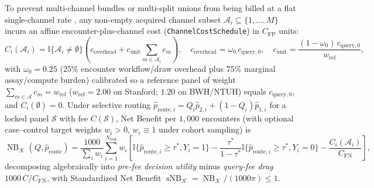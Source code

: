 \documentclass[11pt]{article}
\theoremstyle{remark}
\begin{document}
To prevent multi-channel bundles or multi-split unions from being billed at a flat single-channel rate \citep{turney1995cost,satz2026collision}, any non-empty acquired channel subset $\mathcal{A}_i \subseteq \{1,\dots,M\}$ incurs an affine encounter-plus-channel cost (\texttt{ChannelCostSchedule}) in $C_{\text{FP}}$ units:
\begin{equation}
  C_i(\mathcal{A}_i) = \mathbb{I}\{\mathcal{A}_i \ne \emptyset\}\!\left(c_{\text{overhead}} + c_{\text{unit}} \sum_{m \in \mathcal{A}_i} c_m\right), \quad c_{\text{overhead}} = \omega_0\, c_{\text{query},0}, \quad c_{\text{unit}} = \frac{(1 - \omega_0)\,c_{\text{query},0}}{w_{\text{ref}}},
  \label{eq:cost_schedule}
\end{equation}
with $\omega_0 = 0.25$ ($25\%$ encounter workflow/draw overhead plus $75\%$ marginal assay/compute burden) calibrated so a reference panel of weight $\sum_{m\in\mathcal{A}} c_m = w_{\text{ref}}$ ($w_{\text{ref}}=2.00$ on Stanford; $1.20$ on BWH/NTUH) equals $c_{\text{query},0}$, and $C_i(\emptyset)=0$. Under selective routing $\hat{p}_{\text{route},i} = Q_i \hat{p}_{2,i} + (1 - Q_i)\hat{p}_{1,i}$ for a locked panel $\mathcal{S}$ with fee $C(\mathcal{S})$, Net Benefit per $1{,}000$ encounters (with optional case--control target weights $w_i > 0$, $w_i \equiv 1$ under cohort sampling) is
\begin{equation}
  \operatorname{NB}_{\mathcal{K}}(Q, \hat{p}_{\text{route}}) = \frac{1000}{\sum_i w_i} \sum_{i=1}^{N_{\text{test}}} w_i \!\left[ \mathbb{I}\{\hat{p}_{\text{route},i} \ge \tau^*, Y_i = 1\} - \frac{\tau^*}{1-\tau^*} \mathbb{I}\{\hat{p}_{\text{route},i} \ge \tau^*, Y_i = 0\} - \frac{C_i(\mathcal{A}_i)}{C_{\text{FN}}} \right],
  \label{eq:nb}
\end{equation}
decomposing algebraically into \emph{pre-fee decision utility} minus \emph{query-fee drag} $1000\,\overline{C}/C_{\text{FN}}$, with Standardized Net Benefit $\operatorname{sNB}_{\mathcal{K}} = \operatorname{NB}_{\mathcal{K}} / (1000\pi) \le 1$.
\end{document}
